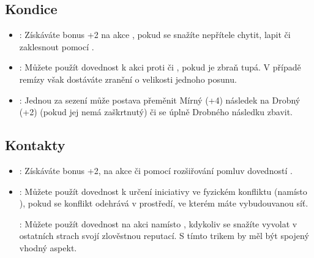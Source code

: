 \documentclass[../main.tex]{subfiles}
\begin{document}
\subsection{Kondice}
\label{sec:trik-kondice}

\begin{itemize}
\item{}:
\label{sec:kondice-zapas}
Získáváte bonus +2 na akce , pokud se snažíte nepřítele chytit, lapit či zaklesnout pomocí .

\item{}:
\label{sec:kondice-drsnak}
Můžete použít dovednost  k akci  proti  či , pokud je zbraň tupá. V případě remízy však dostáváte zranění o velikosti jednoho posunu.

\item{}:
\label{sec:kondice-nezdolny}
Jednou za sezení může postava přeměnit Mírný (+4) následek na Drobný (+2) (pokud jej nemá zaškrtnutý) či se úplně Drobného následku zbavit.
\end{itemize}

\subsection{Kontakty}
\label{sec:trik-kontakty}

\begin{itemize}
\item{}:
\label{sec:kontakty-drbna}
Získáváte bonus +2, na akce  či  pomocí rozšiřování pomluv dovedností .

\item{}:
\label{sec:kontakty-ucho}
Můžete použít dovednost  k určení iniciativy ve fyzickém konfliktu (namísto ), pokud se konflikt odehrává v prostředí, ve kterém máte vybudouvanou síť.

:
\label{sec:kontakty-reputace}
Můžete použít dovednost  na akci  namísto , kdykoliv se snažíte vyvolat v ostatních strach svojí zlověstnou reputací. S tímto trikem by měl být spojený vhodný aspekt.
\end{itemize}
\end{document}
